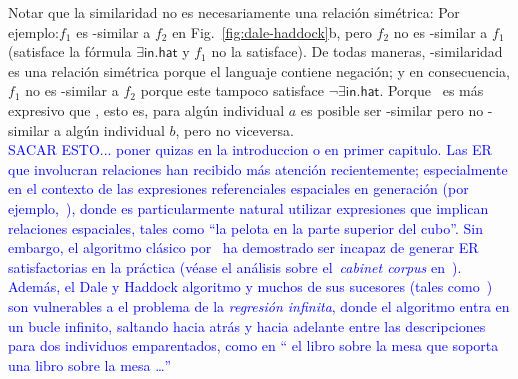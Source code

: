 Notar que la similaridad no es necesariamente una relaci\'on sim\'etrica: Por ejemplo:$f_1$ es \el-similar a $f_2$ en
Fig.~\ref{fig:dale-haddock}b, pero $f_2$ no es \el-similar a $f_1$
(satisface la f\'ormula $\exists \mathsf{in}.\mathsf{hat}$ y $f_1$
no la satisface).  De todas maneras, \alc-similaridad es una relaci\'on sim\'etrica porque
el languaje contiene negaci\'on; y en consecuencia, $f_1$ no es \alc-similar
a $f_2$ porque este tampoco satisface $\neg \exists
\mathsf{in}.\mathsf{hat}$.  Porque \alc\ es m\'as expresivo que \el,
esto es, para alg\'un individual $a$ es posible ser \el-similar pero
no \alc-similar a alg\'un individual $b$, pero no viceversa.\\



\textcolor{blue}{SACAR ESTO... poner quizas en la introduccion o en primer capitulo. Las ER que involucran relaciones han recibido m\'as atenci\'on recientemente;
especialmente en el contexto de las expresiones referenciales espaciales en 
generaci\'on (por ejemplo,~\cite{kelleher06:increm}),
donde es particularmente natural utilizar expresiones que implican 
relaciones espaciales, tales como ``la pelota en la parte superior del cubo''. Sin embargo, el
algoritmo cl\'asico
por~\cite{dale91:gener} ha demostrado ser
incapaz de generar ER satisfactorias en la pr\'actica (v\'ease el an\'alisis sobre
el~\emph{cabinet corpus}
en~\cite{viethen06:_algor_for_gener_refer_expres}). Adem\'as, el
Dale y Haddock algoritmo y muchos de sus sucesores (tales
como~\cite{kelleher06:increm}) son vulnerables a
el problema de la \emph{regresi\'on infinita}, donde el algoritmo entra en un
bucle infinito, saltando hacia atr\'as y hacia adelante entre las descripciones para dos
individuos emparentados, como en `` el libro sobre la mesa que soporta una
libro sobre la mesa \ldots ''}



